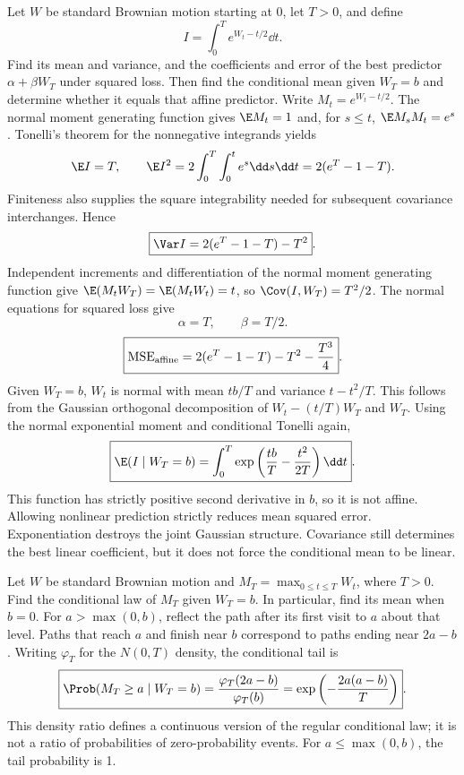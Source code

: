 Let $W$ be standard Brownian motion starting at 0, let $T>0$, and define
\[
 I=\int_0^T e^{W_t-t/2}\dd t.
\]
Find its mean and variance, and the coefficients and error of the best predictor $\alpha+\beta W_T$ under squared loss. Then find the conditional mean given $W_T=b$ and determine whether it equals that affine predictor.
\solution Write $M_t=e^{W_t-t/2}$. The normal moment generating function gives $\E M_t=1$ and, for $s\le t$, $\E M_sM_t=e^s$. Tonelli's theorem for the nonnegative integrands yields
\[
 \E I=T,\qquad
 \E I^2=2\int_0^T\int_0^t e^s\dd s\dd t
 =2(e^T-1-T).
\]
Finiteness also supplies the square integrability needed for subsequent covariance interchanges. Hence
\[
 \boxed{\Var I=2(e^T-1-T)-T^2}.
\]
Independent increments and differentiation of the normal moment generating function give $\E(M_tW_T)=\E(M_tW_t)=t$, so $\Cov(I,W_T)=T^2/2$. The normal equations for squared loss give
\[
 \boxed{\alpha=T,\qquad\beta=T/2}.
\]
\[
 \boxed{\operatorname{MSE}_{\rm affine}=2(e^T-1-T)-T^2-\frac{T^3}{4}}.
\]
Given $W_T=b$, $W_t$ is normal with mean $tb/T$ and variance $t-t^2/T$. This follows from the Gaussian orthogonal decomposition of $W_t-(t/T)W_T$ and $W_T$. Using the normal exponential moment and conditional Tonelli again,
\[
 \boxed{\E(I\mid W_T=b)=\int_0^T
 \exp\left(\frac{tb}{T}-\frac{t^2}{2T}\right)\dd t}.
\]
This function has strictly positive second derivative in $b$, so it is not affine. Allowing nonlinear prediction strictly reduces mean squared error.
\insight Exponentiation destroys the joint Gaussian structure. Covariance still determines the best linear coefficient, but it does not force the conditional mean to be linear.

Let $W$ be standard Brownian motion and $M_T=\max_{0\le t\le T}W_t$, where $T>0$. Find the conditional law of $M_T$ given $W_T=b$. In particular, find its mean when $b=0$.
\solution For $a>\max(0,b)$, reflect the path after its first visit to $a$ about that level. Paths that reach $a$ and finish near $b$ correspond to paths ending near $2a-b$. Writing $\varphi_T$ for the $N(0,T)$ density, the conditional tail is
\[
 \boxed{\Prob(M_T\ge a\mid W_T=b)
 =\frac{\varphi_T(2a-b)}{\varphi_T(b)}
 =\exp\left(-\frac{2a(a-b)}T\right)}.
\]
This density ratio defines a continuous version of the regular conditional law; it is not a ratio of probabilities of zero-probability events. For $a\le\max(0,b)$, the tail probability is 1.

